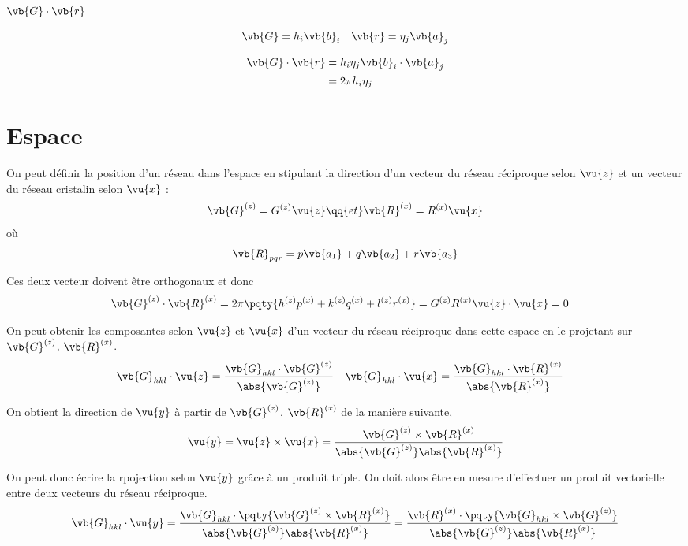 $\vb{G} \cdot \vb{r}$

\begin{align*}
	\vb{G} &= h_i \vb{b}_i & \vb{r} = \eta_j \vb{a}_j
\end{align*}

\begin{align*}
	\vb{G} \cdot \vb{r} 
	&= h_i \eta_j \vb{b}_i \cdot \vb{a}_j \\
	&= 2 \pi h_i \eta_j
\end{align*}

\section{Espace} %
\label{sec:espace}

On peut définir la position d'un réseau dans l'espace en stipulant la direction d'un vecteur du réseau réciproque selon $\vu{z}$ et un vecteur du réseau cristalin selon $\vu{x}$ :
\begin{align*}
	\vb{G}^{(z)} = G^{(z)}\vu{z} \qq{et} \vb{R}^{(x)} = R^{(x)} \vu{x}
\end{align*} où
\begin{align*}
	\vb{R}_{pqr} = p \vb{a_1} + q \vb{a_2} + r \vb{a_3}
\end{align*}

Ces deux vecteur doivent être orthogonaux et donc
\begin{align*}
	\vb{G}^{(z)} \cdot \vb{R}^{(x)} &= 2\pi\pqty{ h^{(z)}p^{(x)} + k^{(z)}q^{(x)} + l^{(z)}r^{(x)}} = G^{(z)}R^{(x)} \vu{z} \cdot \vu{x} = 0
\end{align*}

On peut obtenir les composantes selon $\vu{z}$ et $\vu{x}$ d'un vecteur du réseau réciproque dans cette espace en le projetant sur $\vb{G}^{(z)}$, $\vb{R}^{(x)}$. 
\begin{align*}
	\vb{G}_{hkl} \cdot \vu{z} &= \frac{\vb{G}_{hkl} \cdot \vb{G}^{(z)}}{\abs{\vb{G}^{(z)}}} &
	\vb{G}_{hkl} \cdot \vu{x} &= \frac{\vb{G}_{hkl} \cdot \vb{R}^{(x)}}{\abs{\vb{R}^{(x)}}}
\end{align*}

On obtient la direction de $\vu{y}$ à partir de $\vb{G}^{(z)}$, $\vb{R}^{(x)}$ de la manière suivante,
\begin{align*}
	\vu{y} = \vu{z} \times \vu{x} = \frac{\vb{G}^{(z)}\times \vb{R}^{(x)}}{\abs{\vb{G}^{(z)}}\abs{\vb{R}^{(x)}}}
\end{align*}

On peut donc écrire la rpojection selon $\vu{y}$ grâce à un produit triple. On doit alors être en mesure d'effectuer un produit vectorielle entre deux vecteurs du réseau réciproque.
\begin{align*}
	\vb{G}_{hkl} \cdot \vu{y} = \frac{\vb{G}_{hkl} \cdot \pqty{\vb{G}^{(z)}\times \vb{R}^{(x)}}}{\abs{\vb{G}^{(z)}}\abs{\vb{R}^{(x)}}} 
	= \frac{\vb{R}^{(x)}  \cdot \pqty{\vb{G}_{hkl} \times \vb{G}^{(z)}}}{\abs{\vb{G}^{(z)}}\abs{\vb{R}^{(x)}}}
\end{align*}

